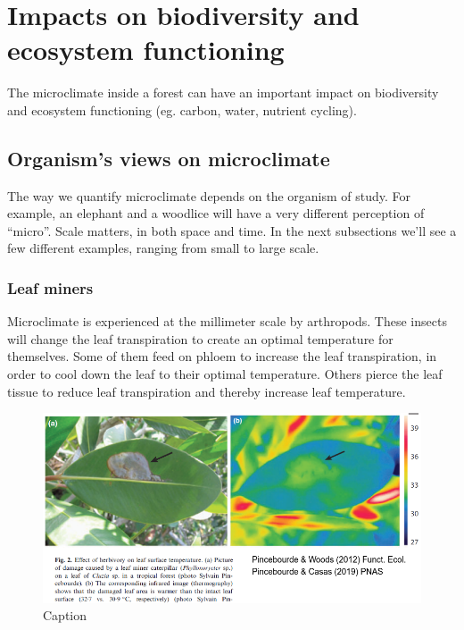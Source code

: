 \documentclass[12pt,oneside]{book}
\begin{document}
\section{Impacts on biodiversity and ecosystem
functioning}\label{impacts-on-biodiversity-and-ecosystem-functioning}

The microclimate inside a forest can have an important impact on
biodiversity and ecosystem functioning (eg. carbon, water, nutrient
cycling).

\subsection{Organism's views on
microclimate}\label{organisms-views-on-microclimate}

The way we quantify microclimate depends on the organism of study. For
example, an elephant and a woodlice will have a very different
perception of ``micro''. Scale matters, in both space and time. In the
next subsections we'll see a few different examples, ranging from small
to large scale.

\subsubsection{Leaf miners}\label{leaf-miners}

Microclimate is experienced at the millimeter scale by arthropods. These
insects will change the leaf transpiration to create an optimal
temperature for themselves. Some of them feed on phloem to increase the
leaf transpiration, in order to cool down the leaf to their optimal
temperature. Others pierce the leaf tissue to reduce leaf transpiration
and thereby increase leaf temperature.

\begin{figure}

{\centering \includegraphics[width=1\linewidth]{figures/Figure1033} 

}

\caption{Caption}\label{fig:Micro33}
\end{figure}
\end{document}
